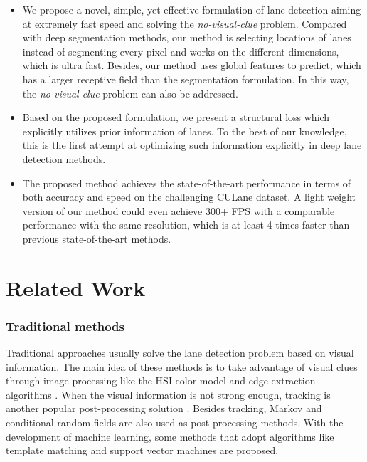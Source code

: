 \documentclass[runningheads]{llncs}
\begin{document}
\begin{itemize}
	\item We propose a novel, simple, yet effective formulation of lane detection aiming at extremely fast speed and solving the \textit{no-visual-clue} problem. Compared with deep segmentation methods, our method is selecting locations of lanes instead of segmenting every pixel and works on the different dimensions, which is ultra fast. Besides, our method uses global features to predict, which has a larger receptive field than the segmentation formulation. In this way, the \textit{no-visual-clue} problem can also be addressed.
	\item Based on the proposed formulation, we present a structural loss which explicitly utilizes prior information of lanes. To the best of our knowledge, this is the first attempt at optimizing such information explicitly in deep lane detection methods.
	\item The proposed method achieves the state-of-the-art performance  in terms of both accuracy and speed on the challenging CULane dataset. A light weight version of our method could even achieve 300+ FPS with a comparable performance with the same resolution, which is at least 4 times faster than previous state-of-the-art methods.

\end{itemize}

\section{Related Work}
\subsubsection{Traditional methods}
Traditional approaches usually solve the lane detection problem based on visual information. The main idea of these methods is to take advantage of visual clues through image processing like the HSI color model \cite{sun2006hsi} and edge extraction algorithms \cite{yu1997lane,wang2000lane}. When the visual information is not strong enough, tracking is another popular post-processing solution \cite{wang2004lane,kim2008robust}. Besides tracking, Markov and conditional random fields \cite{CRF} are also used as post-processing methods. With the development of machine learning, some methods \cite{kluge1995deformable,gonzalez2000lane,mandalia2005using} that adopt algorithms like template matching and support vector machines are proposed. 
\end{document}
